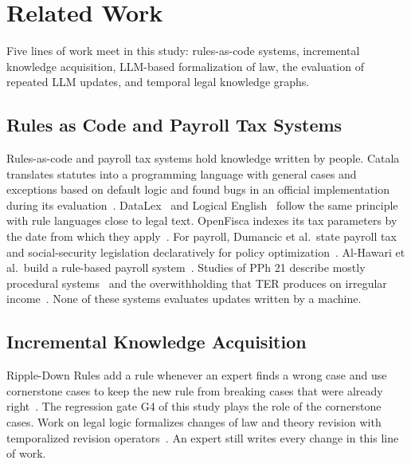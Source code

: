 \section{Related Work}
\label{sec:related}
Five lines of work meet in this study: rules-as-code systems, incremental knowledge acquisition, LLM-based formalization of law, the evaluation of repeated LLM updates, and temporal legal knowledge graphs.

\subsection{Rules as Code and Payroll Tax Systems}
Rules-as-code and payroll tax systems hold knowledge written by people. Catala translates statutes into a programming language with general cases and exceptions based on default logic and found bugs in an official implementation during its evaluation~\cite{merigoux2021catala,huttner2022catala}. DataLex~\cite{mowbray2023scaling,mowbray2023xai} and Logical English~\cite{kowalski2022logicalenglish} follow the same principle with rule languages close to legal text. OpenFisca indexes its tax parameters by the date from which they apply~\cite{openfisca}. For payroll, Dumancic et al.\ state payroll tax and social-security legislation declaratively for policy optimization~\cite{dumancic2021payroll}. Al-Hawari et al.\ build a rule-based payroll system~\cite{alhawari2026payroll}. Studies of PPh 21 describe mostly procedural systems~\cite{ramadhani2021grossup,yulistyawati2022payroll,kusuma2026pph21} and the overwithholding that TER produces on irregular income~\cite{sherra2025ter}. None of these systems evaluates updates written by a machine.

\subsection{Incremental Knowledge Acquisition}
Ripple-Down Rules add a rule whenever an expert finds a wrong case and use cornerstone cases to keep the new rule from breaking cases that were already right~\cite{compton2021rdr}. The regression gate G4 of this study plays the role of the cornerstone cases. Work on legal logic formalizes changes of law and theory revision with temporalized revision operators~\cite{moguillansky2024temporalised}. An expert still writes every change in this line of work.

